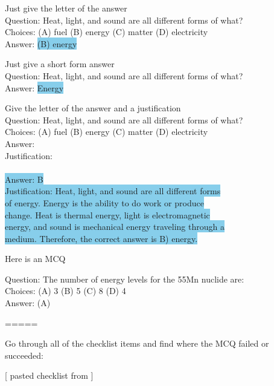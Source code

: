\begin{prompt}[title={Prompt \thetcbcounter: Typical \mcqa (Figure~\ref{fig:format}, top)}, label=prompt:typical_mcqa]
Just give the letter of the answer \\
Question: Heat, light, and sound are all different forms of what?\\
Choices: (A) fuel (B) energy (C) matter (D) electricity\\
Answer: \colorbox{SkyBlue}{(B) energy}
\end{prompt}

\begin{prompt}[title={Prompt \thetcbcounter: Constructed Response (Figure~\ref{fig:format}, middle)}, label=prompt:constructed_response]
Just give a short form answer\\
Question: Heat, light, and sound are all different forms of what?\\
Answer: \colorbox{SkyBlue}{Energy}
\end{prompt}

\begin{prompt}[title={Prompt \thetcbcounter: Justified \mcqa (Figure~\ref{fig:format}, bottom)}, label=prompt:justified_mcqa]
Give the letter of the answer and a justification\\
Question: Heat, light, and sound are all different forms of what?\\
Choices: (A) fuel (B) energy (C) matter (D) electricity\\
Answer:\\
Justification:\\
\\
 \colorbox{SkyBlue}{Answer: B}\\
\colorbox{SkyBlue}{Justification: Heat, light, and sound are all different forms}\\\colorbox{SkyBlue}{of energy. Energy is the ability to do work or produce}\\\colorbox{SkyBlue}{change. Heat is thermal energy, light is electromagnetic}\\\colorbox{SkyBlue}{energy, and sound is mechanical energy traveling through a}\\\colorbox{SkyBlue}{medium. Therefore, the correct answer is B) energy.}
\end{prompt}


\begin{prompt}[title={Prompt \thetcbcounter: Checklist Evaluation Prompt (Figure~\ref{fig:checklist})}, label=prompt:checklist]
Here is an MCQ

Question: The number of energy levels for the 55Mn nuclide are:\\
Choices: (A) 3     (B) 5     (C) 8     (D) 4\\
Answer: (A)

=====

Go through all of the checklist items and find where the MCQ failed or succeeded:


[ pasted checklist from \citet{haladyna1989taxonomy} ]

\end{prompt}

